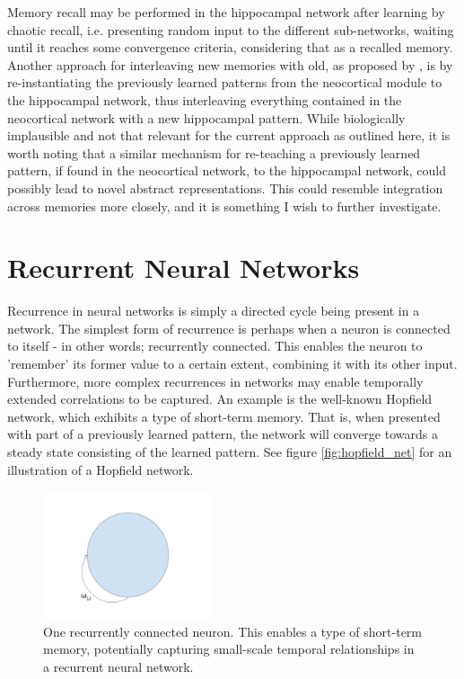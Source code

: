 Memory recall may be performed in the hippocampal network after learning by chaotic recall, i.e. presenting random input to the different sub-networks, waiting until it reaches some convergence criteria, considering that as a recalled memory. Another approach for interleaving new memories with old, as proposed by \cite{French1997}, is by re-instantiating the previously learned patterns from the neocortical module to the hippocampal network, thus interleaving everything contained in the neocortical network with a new hippocampal pattern. While biologically implausible and not that relevant for the current approach as outlined here, it is worth noting that a similar mechanism for re-teaching a previously learned pattern, if found in the neocortical network, to the hippocampal network, could possibly lead to novel abstract representations. This could resemble integration across memories more closely, and it is something I wish to further investigate.


\section{Recurrent Neural Networks}

Recurrence in neural networks is simply a directed cycle being present in a network. The simplest form of recurrence is perhaps when a neuron is connected to itself - in other words; recurrently connected. This enables the neuron to 'remember' its former value to a certain extent, combining it with its other input. Furthermore, more complex recurrences in networks may enable temporally extended correlations to be captured. An example is the well-known Hopfield network, which exhibits a type of short-term memory. That is, when presented with part of a previously learned pattern, the network will converge towards a steady state consisting of the learned pattern. See figure \ref{fig:hopfield_net} for an illustration of a Hopfield network.

\begin{figure}
\centering
\includegraphics[width=5cm]{fig/one_recurrent_neuron}
\caption{One recurrently connected neuron. This enables a type of short-term memory, potentially capturing small-scale temporal relationships in a recurrent neural network.}
\label{fig:one_recurrent_neuron}
\end{figure}


